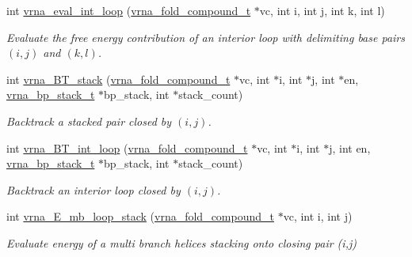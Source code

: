 \begin{DoxyCompactItemize}
\item 
int \hyperlink{group__loops_ga018f1314dbbae42fdd27c94670b61721}{vrna\+\_\+eval\+\_\+int\+\_\+loop} (\hyperlink{group__fold__compound_ga1b0cef17fd40466cef5968eaeeff6166}{vrna\+\_\+fold\+\_\+compound\+\_\+t} $\ast$vc, int i, int j, int k, int l)
\begin{DoxyCompactList}\small\item\em Evaluate the free energy contribution of an interior loop with delimiting base pairs $(i,j)$ and $(k,l)$. \end{DoxyCompactList}\item 
\mbox{\label{group__loops_gad320d5d721e33bed120168213d8f45e5}} 
int \hyperlink{group__loops_gad320d5d721e33bed120168213d8f45e5}{vrna\+\_\+\+B\+T\+\_\+stack} (\hyperlink{group__fold__compound_ga1b0cef17fd40466cef5968eaeeff6166}{vrna\+\_\+fold\+\_\+compound\+\_\+t} $\ast$vc, int $\ast$i, int $\ast$j, int $\ast$en, \hyperlink{group__data__structures_gaa651bda42e7692f08cb603cd6834b0ee}{vrna\+\_\+bp\+\_\+stack\+\_\+t} $\ast$bp\+\_\+stack, int $\ast$stack\+\_\+count)
\begin{DoxyCompactList}\small\item\em Backtrack a stacked pair closed by $ (i,j) $. \end{DoxyCompactList}\item 
\mbox{\label{group__loops_ga849b7dc373b6c0b029672e16a7e52053}} 
int \hyperlink{group__loops_ga849b7dc373b6c0b029672e16a7e52053}{vrna\+\_\+\+B\+T\+\_\+int\+\_\+loop} (\hyperlink{group__fold__compound_ga1b0cef17fd40466cef5968eaeeff6166}{vrna\+\_\+fold\+\_\+compound\+\_\+t} $\ast$vc, int $\ast$i, int $\ast$j, int en, \hyperlink{group__data__structures_gaa651bda42e7692f08cb603cd6834b0ee}{vrna\+\_\+bp\+\_\+stack\+\_\+t} $\ast$bp\+\_\+stack, int $\ast$stack\+\_\+count)
\begin{DoxyCompactList}\small\item\em Backtrack an interior loop closed by $ (i,j) $. \end{DoxyCompactList}\item 
int \hyperlink{group__loops_ga73f048d35475e1d8f50b7d4ac6a2aeb6}{vrna\+\_\+\+E\+\_\+mb\+\_\+loop\+\_\+stack} (\hyperlink{group__fold__compound_ga1b0cef17fd40466cef5968eaeeff6166}{vrna\+\_\+fold\+\_\+compound\+\_\+t} $\ast$vc, int i, int j)
\begin{DoxyCompactList}\small\item\em Evaluate energy of a multi branch helices stacking onto closing pair (i,j) \end{DoxyCompactList}\item 

\end{DoxyCompactItemize}

